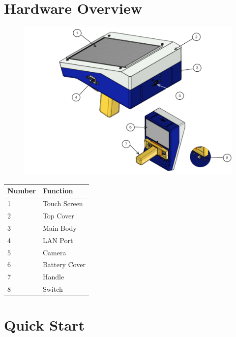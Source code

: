 \chapter{Hardware Overview}

\begin{figure}
    \centering
    \includegraphics[width=\textwidth]{texs/chapter1/image/111.png}
\end{figure}

\begin{table}
    \centering
    \begin{tabular}{|l|l|}
        \hline
        \textbf{Number} & \textbf{Function} \\ \hline
        1               & Touch Screen      \\ \hline
        2               & Top Cover         \\ \hline
        3               & Main Body         \\ \hline
        4               & LAN Port          \\ \hline
        5               & Camera            \\ \hline
        6               & Battery Cover     \\ \hline
        7               & Handle            \\ \hline
        8               & Switch            \\ \hline
    \end{tabular}
\end{table}

\chapter{Quick Start}

